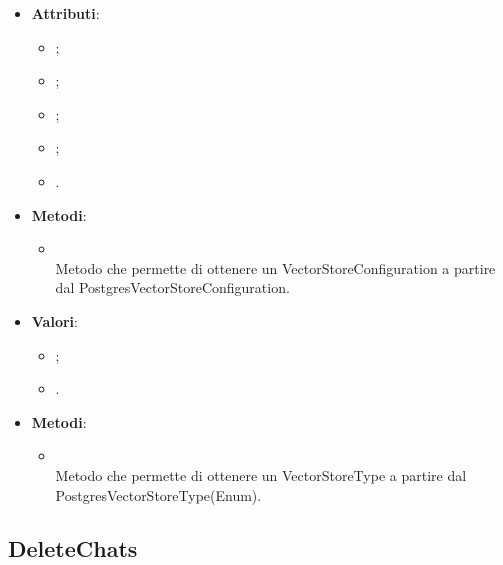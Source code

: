 \documentclass[10pt, a4paper]{article}
\begin{document}
\label{PostgresVectorStoreConfigurationDettaglio}
\begin{itemize}
    \item \textbf{Attributi}:
    \begin{itemize}
        \item {};
        \item {};
        \item {};
        \item {};
        \item {}.  
    \end{itemize}
    \item \textbf{Metodi}:
    \begin{itemize}
        \item {}\\ 
        Metodo che permette di ottenere un VectorStoreConfiguration a partire dal PostgresVectorStoreConfiguration.
    \end{itemize}
\end{itemize}

\label{PostgresVectorStoreTypeDettaglio}
\begin{itemize}
    \item \textbf{Valori}:
    \begin{itemize}
        \item {};
        \item {}. 
    \end{itemize}
    \item \textbf{Metodi}:
    \begin{itemize}
        \item {}\\ 
        Metodo che permette di ottenere un VectorStoreType a partire dal PostgresVectorStoreType(Enum).
    \end{itemize}
\end{itemize}





\subsection{DeleteChats}
\end{document}
